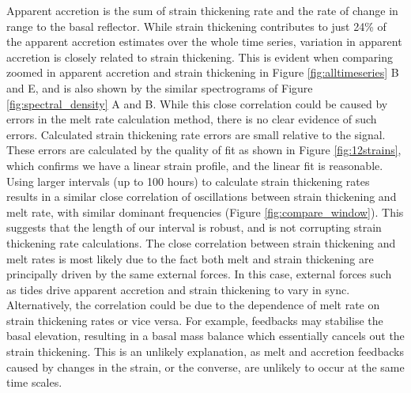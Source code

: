 Apparent accretion is the sum of strain thickening rate and the rate of change in range to the basal reflector. While strain thickening contributes to just 24\% of the apparent accretion estimates over the whole time series, variation in apparent accretion is closely related to strain thickening. This is evident when comparing zoomed in apparent accretion and strain thickening in Figure \ref{fig:alltimeseries} B and E, and is also shown by the similar spectrograms of Figure \ref{fig:spectral_density} A and B. While this close correlation could be caused by errors in the melt rate calculation method, there is no clear evidence of such errors. Calculated strain thickening rate errors are small relative to the signal. These errors are calculated by the quality of fit as shown in Figure \ref{fig:12strains}, which confirms we have a linear strain profile, and the linear fit is reasonable. 
Using larger intervals (up to 100 hours) to calculate strain thickening rates results in a similar close correlation of oscillations between strain thickening and melt rate, with similar dominant frequencies (Figure \ref{fig:compare_window}). This suggests that the length of our interval is robust, and is not corrupting strain thickening rate calculations. 
The close correlation between strain thickening and melt rates is most likely due to the fact both melt and strain thickening are principally driven by the same external forces. In this case, external forces such as tides drive apparent accretion and strain thickening to vary in sync. Alternatively, the correlation could be due to the dependence of melt rate on strain thickening rates or vice versa.  For example, feedbacks may stabilise the basal elevation,  resulting in a basal mass balance which essentially cancels out the strain thickening. This is an unlikely explanation, as melt and accretion feedbacks caused by changes in the strain, or the converse, are unlikely to occur at the same time scales. 

